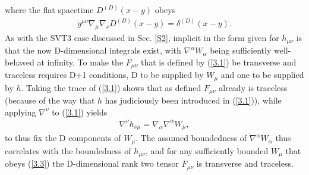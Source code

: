 \documentclass[aps,onecolumn,10pt]{revtex4}
\numberwithin{equation}{section}
\numberwithin{equation}{section}
\begin{document}
%
where the flat spacetime $D^{(D)}(x-y)$ obeys 
\begin{eqnarray}
g^{\mu\nu}\nabla_{\mu}\nabla_{\nu}D^{(D)}(x-y)=\delta^{(D)}(x-y).
\label{3.2}
\end{eqnarray}
%
As with the SVT3 case discussed in Sec. \ref{S2}, implicit in the form given for $h_{\mu\nu}$  is that the now D-dimensional integrals exist, with $\nabla^{\alpha}W_{\alpha}$ being sufficiently well-behaved at infinity.
To make the $F_{\mu\nu}$ that is defined by (\ref{3.1}) be transverse and traceless requires D+1 conditions, D to be supplied by $W_{\mu}$ and one  to be supplied by $h$. Taking the trace of (\ref{3.1}) shows that as defined $F_{\mu\nu}$ already is traceless (because of the way that $h$ has judiciously been introduced in (\ref{3.1})), while applying $\nabla^{\nu}$  to (\ref{3.1}) yields
%
\begin{eqnarray}
\nabla^{\nu}h_{\nu\mu}=\nabla_{\alpha}\nabla^{\alpha}W_{\mu},
\label{3.3}
\end{eqnarray}
% 
to thus fix the D components of $W_{\mu}$. The assumed boundedness of $\nabla^{\alpha}W_{\alpha}$ thus correlates with the boundedness of $h_{\mu\nu}$, and  for any sufficiently bounded $W_{\mu}$ that obeys (\ref{3.3}) the D-dimensional rank two tensor $F_{\mu\nu}$ is transverse and traceless.
\end{document}

